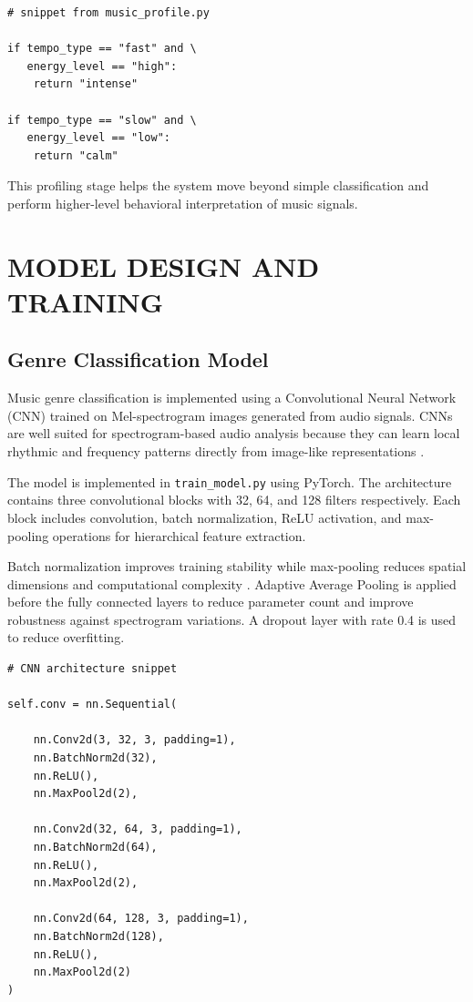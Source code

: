 \documentclass[12pt,a4paper]{report}
\begin{document}
\begin{lstlisting}
# snippet from music_profile.py

if tempo_type == "fast" and \
   energy_level == "high":
    return "intense"

if tempo_type == "slow" and \
   energy_level == "low":
    return "calm"
\end{lstlisting}

This profiling stage helps the system move beyond simple classification and perform higher-level behavioral interpretation of music signals.

\chapter{MODEL DESIGN AND TRAINING}

\section{Genre Classification Model}

Music genre classification is implemented using a Convolutional Neural Network (CNN) trained on Mel-spectrogram images generated from audio signals. CNNs are well suited for spectrogram-based audio analysis because they can learn local rhythmic and frequency patterns directly from image-like representations \cite{r3,r4,r5,r14}.

The model is implemented in \texttt{train\_model.py} using PyTorch. The architecture contains three convolutional blocks with 32, 64, and 128 filters respectively. Each block includes convolution, batch normalization, ReLU activation, and max-pooling operations for hierarchical feature extraction.

Batch normalization improves training stability while max-pooling reduces spatial dimensions and computational complexity \cite{r10,r15}. Adaptive Average Pooling is applied before the fully connected layers to reduce parameter count and improve robustness against spectrogram variations. A dropout layer with rate 0.4 is used to reduce overfitting.

\begin{lstlisting}
# CNN architecture snippet

self.conv = nn.Sequential(

    nn.Conv2d(3, 32, 3, padding=1),
    nn.BatchNorm2d(32),
    nn.ReLU(),
    nn.MaxPool2d(2),

    nn.Conv2d(32, 64, 3, padding=1),
    nn.BatchNorm2d(64),
    nn.ReLU(),
    nn.MaxPool2d(2),

    nn.Conv2d(64, 128, 3, padding=1),
    nn.BatchNorm2d(128),
    nn.ReLU(),
    nn.MaxPool2d(2)
)
\end{lstlisting}
\end{document}
